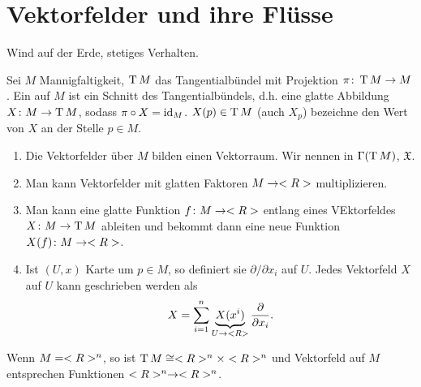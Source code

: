 \section{Vektorfelder und ihre Flüsse}
\begin{example}
	Wind auf der Erde, stetiges Verhalten.
\end{example}

\begin{definition}
	Sei $M$ Mannigfaltigkeit, $\operatorname{T} M$ das Tangentialbündel mit Projektion $\pi\colon \operatorname{T} M\to M$. Ein  auf $M$ ist ein Schnitt des Tangentialbündels, d.h. eine glatte Abbildung $X\colon M\to \operatorname{T} M$, sodass $\pi\circ X = \operatorname{id}_M$. $X(p)\in \operatorname{T} M$ (auch $X_p$) bezeichne den Wert von $X$ an der Stelle $p\in M$.
\end{definition}

\begin{remark}
\begin{enumerate}[label={\arabic*)}]
	\item Die Vektorfelder über $M$ bilden einen Vektorraum. Wir nennen in $\Gamma(\operatorname{T} M)$, $\mathfrak X$.
	\item Man kann Vektorfelder mit glatten Faktoren $M\to <R>$ multiplizieren.
	\item Man kann eine glatte Funktion $f\colon M\to <R>$ entlang eines VEktorfeldes $X\colon M\to \operatorname{T} M$ ableiten und bekommt dann eine neue Funktion $X(f)\colon M\to <R>$.
	\item Ist $(U,x)$ Karte um $p\in M$, so definiert sie  $\partial\slash\partial x_i$ auf $U$. Jedes Vektorfeld $X$ auf $U$ kann geschrieben werden als \begin{align*}
		X = \sum_{i=1}^n \underbrace{X(x^i)}_{U\to <R>}\frac{\partial}{\partial x_i}.
	\end{align*}
\end{enumerate}
\end{remark}

\begin{example}
	Wenn $M=<R>^n$, so ist $\operatorname{T} M\cong <R>^n\times <R>^n$ und Vektorfeld auf $M$ entsprechen Funktionen $<R>^n\to <R>^n$.
\end{example}